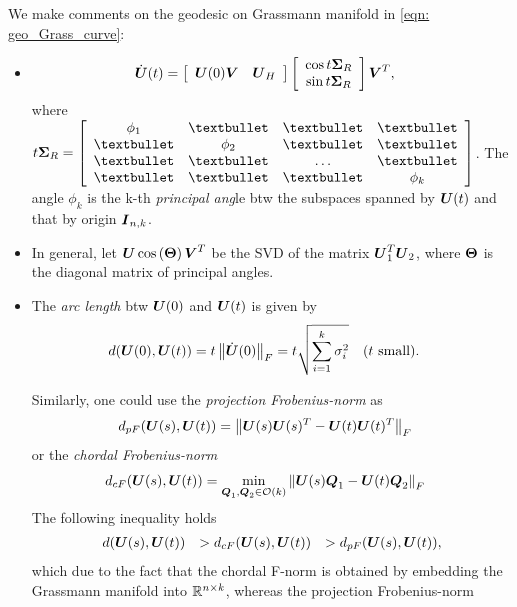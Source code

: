 \documentclass[11pt]{article}
\begin{document}
We make comments on the geodesic on Grassmann manifold in \eqref{eqn: geo_Grass_curve}: 
\begin{itemize}
\item \begin{align*}
\dot{\boldsymbol{U}}(t) &= 
\left[\begin{array}{cc}
\boldsymbol{U}(0)\boldsymbol{V} & \boldsymbol{U}_{H}
\end{array}\right]\left[\begin{array}{c}
\cos t\boldsymbol{\Sigma}_{R}\\
\sin t\boldsymbol{\Sigma}_{R} 
\end{array}\right]\boldsymbol{V}^{T} ,
\end{align*}
where $ t\mb{\Sigma}_{R} = \brac{\begin{array}{cccc}
\phi_{1} & • & • & • \\ 
• & \phi_{2}  & • & • \\ 
• & • & \ldots & • \\ 
• & • & • & \phi_{k} 
\end{array} }$. The angle $\phi_{k}$ is the k-th \emph{principal ang}le btw the subspaces spanned by $\boldsymbol{U}(t)$ and that by origin $\boldsymbol{I}_{n,k}$.

\item In general, let $\boldsymbol{U}\cos\left(\boldsymbol{\Theta}\right)\boldsymbol{V}^{T}$ be the SVD of the matrix $\boldsymbol{U}_{1}^{T}\boldsymbol{U}_{2}$, where $\boldsymbol{\Theta}$ is the diagonal matrix of principal angles.

\item The \emph{arc length} btw $\boldsymbol{U}(0)$ and $\boldsymbol{U}(t)$ is given by 
\begin{align}
d(\boldsymbol{U}(0), \boldsymbol{U}(t)) &= t\left\|\dot{\boldsymbol{U}}(0)\right\|_{F} = t\sqrt{\sum_{i=1}^{k}\sigma_{i}^{2}} \quad(t\text{ small}). \label{eqn: arc_length_Grass}
\end{align}

Similarly, one could use the \emph{projection Frobenius-norm} as
\begin{align}
d_{pF}(\boldsymbol{U}(s), \boldsymbol{U}(t)) &= \left\|\boldsymbol{U}(s)\boldsymbol{U}(s)^{T} -  \boldsymbol{U}(t)\boldsymbol{U}(t)^{T} \right\|_{F} \label{eqn: proj_F_norm_Grass}
\end{align}
or
the \emph{chordal Frobenius-norm}
\begin{align}
d_{cF}(\boldsymbol{U}(s), \boldsymbol{U}(t)) &= \min_{\boldsymbol{Q}_{1}, \boldsymbol{Q}_{2} \in {\mathcal O}(k)}\left\|\boldsymbol{U}(s)\boldsymbol{Q}_{1} -  \boldsymbol{U}(t)\boldsymbol{Q}_{2} \right\|_{F} \label{eqn: proj_F_norm_Grass}
\end{align}
The following inequality holds
\begin{align}
d(\boldsymbol{U}(s), \boldsymbol{U}(t))&&> d_{cF}(\boldsymbol{U}(s), \boldsymbol{U}(t)) &&> d_{pF}(\boldsymbol{U}(s), \boldsymbol{U}(t)),
\end{align}which due to the fact that the chordal F-norm is obtained by embedding the Grassmann manifold into ${\mathbb R}^{n\times k}$, whereas the projection Frobenius-norm 

\end{itemize}
\end{document}
